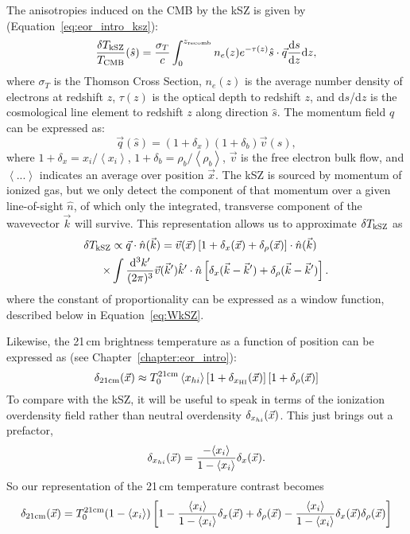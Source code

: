 The anisotropies induced on the CMB by the kSZ is given by (Equation~\ref{eq:eor_intro_ksz}):
\begin{equation}
\frac{\delta T_{\rm kSZ}}{T_{\rm CMB}}(\hat{s}) = \frac{\sigma_T}{c} \int_0^{z_{\rm recomb}} n_e(z)e^{-\tau(z)} \hat{s}\cdot\vec{q} \frac{{\rm d}s}{{\rm d}z}{\rm d}z,
\label{eq:eor_intro_ksz}
\end{equation}
where $\sigma_T$ is the Thomson Cross Section, $n_e(z)$ is the average number density of electrons at redshift $z$, $\tau(z)$ is the optical depth to redshift $z$, and d$s$/d$z$ is the cosmological line element to redshift $z$ along direction $\hat{s}$. 
The momentum field $q$ can be expressed as:
\begin{equation}
\vec{q}(\hat{s}) = (1+\delta_x)(1+\delta_b)\vec{v}(\hat{s}),
\end{equation}
where  $1+\delta_x = x_i/\left\langle x_i \right\rangle$, $1+\delta_b= \rho_b/\left\langle \rho_b \right\rangle$, $\vec{v}$ is the free electron bulk flow, and $\left\langle ... \right\rangle$ indicates an average over position $\vec{x}$. 
The kSZ is sourced by momentum of ionized gas, but we only detect the component of that momentum over a given line-of-sight $\hat{n}$, of which only the integrated, transverse component of the wavevector $\vec{k}$ will survive.
This representation allows us to approximate $\delta T_{\rm kSZ}$ as
\begin{align}
\delta T_{\rm kSZ} &\propto \vec{q}\cdot\hat{n}(\vec{k}) = \vec{v}(\vec{x})\left[1 + \delta_x(\vec{x}) + \delta_{\rho}(\vec{x})\right]\cdot\hat{n}(\vec{k})\\
\times & \int \frac{{\rm d}^3k'}{(2\pi)^3}\vec{v}(\vec{k}')\hat{k}'\cdot\hat{n}\left[\delta_x(\vec{k}-\vec{k}') + \delta_{\rho}(\vec{k}-\vec{k}')\right].
\end{align}
where the constant of proportionality can be expressed as a window function, described below in Equation~\ref{eq:WkSZ}. 

Likewise, the 21\,cm brightness temperature as a function of position can be expressed as (see Chapter~\ref{chapter:eor_intro}):
\begin{equation}
\delta_{\rm 21cm}(\vec{x}) \approx T_0^{\rm 21cm} \left\langle x_{\sc hi} \right\rangle \left[1 + \delta_{x_{\rm HI}}(\vec{x})\right] \left[1 + \delta_\rho(\vec{x})\right]
\label{eq:d21cm}
\end{equation}
To compare with the kSZ, it will be useful to speak in terms of the ionization overdensity field rather than neutral overdensity $\delta_{x_{\sc hi}}(\vec{x})$. This just brings out a prefactor,
\begin{equation}
\delta_{x_{\sc hi}}(\vec{x}) = \frac{-\langle x_i \rangle}{1 - \langle x_i \rangle} \delta_x(\vec{x}).
\end{equation}
So our representation of the 21\,cm temperature contrast becomes
\begin{equation}
\delta_{\rm 21cm}(\vec{x}) = T_0^{\rm21cm} (1 - \langle x_i \rangle ) \left[ 1 - \frac{\langle x_i \rangle}{1 - \langle x_i \rangle} \delta_x(\vec{x}) + \delta_{\rho}(\vec{x})  - \frac{\langle x_i \rangle}{1 - \langle x_i \rangle} \delta_x(\vec{x}) \delta_{\rho}(\vec{x}) \right]
\label{eq:d21cm_x}
\end{equation}

